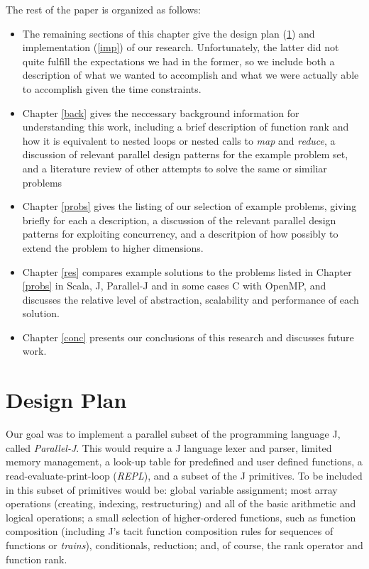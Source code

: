 The rest of the paper is organized as follows:
\begin{itemize} 
	\item The remaining sections of this chapter give the design plan (\ref{desp}) and implementation (\ref{imp}) of our research. 
	Unfortunately, the latter did not quite fulfill the expectations we had in the former, so we include both a description of what we wanted to accomplish and what we were actually able to accomplish given the time constraints. 
	\item Chapter \ref{back} gives the neccessary background information for understanding this work, 
	including a brief description of function rank and how it is equivalent to nested loops or nested calls to \textit{map} and \textit{reduce},
	a discussion of relevant parallel design patterns for the example problem set, 
	and a literature review of other attempts to solve the same or similiar problems
    \item Chapter \ref{probs} gives the listing of our selection of example problems, giving briefly for each a description, a discussion of the relevant parallel design patterns for exploiting concurrency, and a descritpion of how possibly to extend the problem to higher dimensions.
    \item Chapter \ref{res} compares example solutions to the problems listed in Chapter \ref{probs} in Scala, J, Parallel-J and in some cases C with OpenMP, and discusses the relative level of abstraction, scalability and performance of each solution. %
    \item Chapter \ref{conc} presents our conclusions of this research and discusses future work. 
\end{itemize}

\section{Design Plan}
\label{desp}
Our goal was 
to implement a parallel subset of the programming language J, called \textit{Parallel-J}.
This 
would require a J language lexer and parser, limited memory management, a look-up table for predefined and user defined functions, a read-evaluate-print-loop (\textit{REPL}), and a subset of the J primitives.
To be included in this subset of primitives would be: global variable assignment; 
most array operations (creating, indexing, restructuring) and all of the basic arithmetic and logical operations; 
a small selection of higher-ordered functions, such as function composition (including J's tacit function composition rules for sequences of functions or \textit{trains}), conditionals, reduction;
and, 
of course, 
the rank operator and function rank. %


